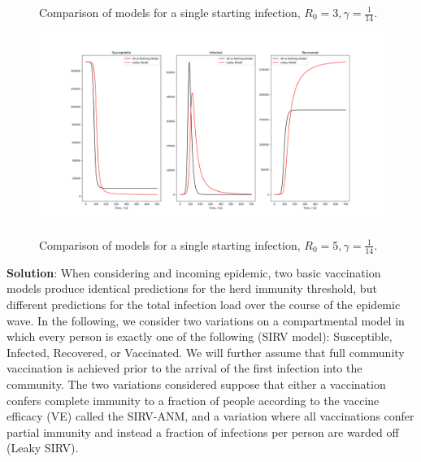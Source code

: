 \documentclass[11pt]{article}
\begin{document}
\begin{enumerate}
\begin{enumerate}[label=\alph*.]
\begin{figure}
		\label{fig:r03}
		\caption{Comparison of models for a single starting infection, $R_0=3, \gamma=\frac{1}{14}$.}
	\end{figure}
	\begin{figure}
		\centering
		\includegraphics[scale=0.4]{R05.png}
		\label{fig:r05}
		\caption{Comparison of models for a single starting infection, $R_0=5, \gamma=\frac{1}{14}$.}
	\end{figure}
	\begin{tcolorbox}
		\textbf{Solution}:
		When considering and incoming epidemic, two basic vaccination models produce identical predictions for the herd immunity threshold, but different predictions for the total infection load over the course of the epidemic wave. In the following, we consider two variations on a compartmental model in which every person is exactly one of the following (SIRV model): Susceptible, Infected, Recovered, or Vaccinated. We will further assume that full community vaccination is achieved prior to the arrival of the first infection into the community. The two variations considered suppose that either a vaccination confers complete immunity to a fraction of people according to the vaccine efficacy (VE) called the SIRV-ANM, and a variation where all vaccinations confer partial immunity and instead a fraction of infections per person are warded off (Leaky SIRV).
		

\end{tcolorbox}
\end{enumerate}
\end{enumerate}
\end{document}
